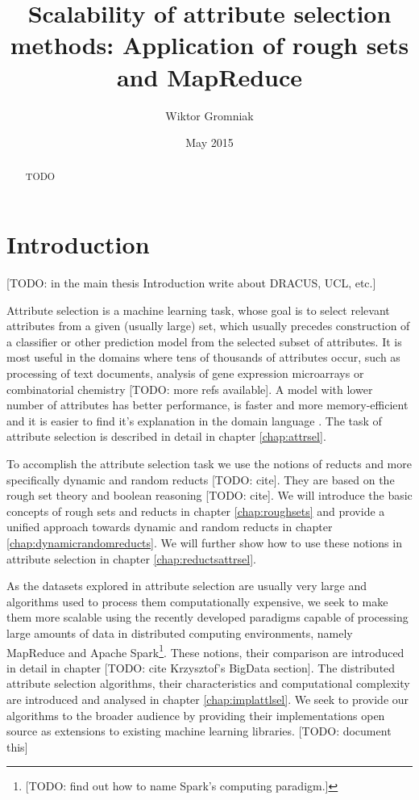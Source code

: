 \documentclass[12pt]{pracamgr}
\title{Scalability of attribute selection methods: Application of rough sets and MapReduce}
\author{Wiktor Gromniak}
\date{May 2015}
\begin{document}
\maketitle
\tableofcontents

\begin{abstract}
TODO
\end{abstract}

\chapter{Introduction}

[TODO: in the main thesis Introduction write about DRACUS, UCL, etc.]

Attribute selection is a machine learning task, whose goal is to select relevant attributes from a given (usually large) set, which usually precedes construction of a classifier or other prediction model from the selected subset of attributes. It is most useful in the domains where tens of thousands of attributes occur, such as processing of text documents, analysis of gene expression microarrays or combinatorial chemistry \cite{guyon} [TODO: more refs available]. A model with lower number of attributes has better performance, is faster and more memory-efficient and it is easier to find it's explanation in the domain language \cite{guyon}. The task of attribute selection is described in detail in chapter \ref{chap:attrsel}.

To accomplish the attribute selection task we use the notions of reducts and more specifically dynamic and random reducts [TODO: cite]. They are based on the rough set theory and boolean reasoning [TODO: cite]. We will introduce the basic concepts of rough sets and reducts in chapter \ref{chap:roughsets} and provide a unified approach towards dynamic and random reducts in chapter \ref{chap:dynamicrandomreducts}. We will further show how to use these notions in attribute selection in chapter \ref{chap:reductsattrsel}.

As the datasets explored in attribute selection are usually very large and algorithms used to process them computationally expensive, we seek to make them more scalable using the recently developed paradigms capable of processing large amounts of data in distributed computing environments, namely MapReduce and Apache Spark\footnote{[TODO: find out how to name Spark's computing paradigm.]}. These notions, their comparison are introduced in detail in chapter [TODO: cite Krzysztof's BigData section]. The distributed attribute selection algorithms, their characteristics and computational complexity are introduced and analysed in chapter \ref{chap:implattlsel}. We seek to provide our algorithms to the broader audience by providing their implementations open source as extensions to existing machine learning libraries. [TODO: document this]
\end{document}
